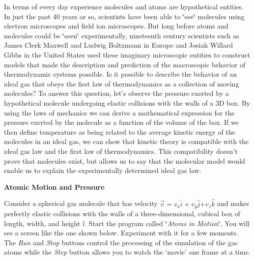 In terms of every day experience molecules and atoms are hypothetical
entities. In just the past 40 years or so, scientists have been able
to \char`\"{}see\char`\"{} molecules using electron microscopes and
field ion microscopes. But long before atoms and molecules could be
\char`\"{}seen\char`\"{} experimentally, nineteenth century scientists
such as James Clerk Maxwell and Ludwig Boltzmann in Europe and Josiah
Willard Gibbs in the United States used these imaginary microscopic
entities to construct models that made the description and prediction
of the macroscopic behavior of thermodynamic systems possible. Is
it possible to describe the behavior of an ideal gas that obeys the
first law of thermodynamics as a collection of moving molecules? To
answer this question, let's observe the pressure exerted by a hypothetical
molecule undergoing elastic collisions with the walls of a 3D box.
By using the laws of mechanics we can derive a mathematical expression
for the pressure exerted by the molecule as a function of the volume
of the box. If we then define temperature as being related to the
average kinetic energy of the molecules in an ideal gas, we can show
that kinetic theory is compatible with the ideal gas law and the first
law of thermodynamics. This compatibility doesn't prove that molecules
exist, but allows us to say that the molecular model would enable
us to explain the experimentally determined ideal gas law.

\textbf{Atomic Motion and Pressure}

Consider a spherical gas molecule that has velocity 
\( \overrightarrow{v}=v_{x} \)\( \hat{i}+v_{y} \)\( \hat{j} \)\( + v_z\hat k\) and
makes perfectly elastic collisions with the walls of a three-dimensional, cubical
box of length, width, and height $l$. Start the program called \char`\"{}\textit{Atoms
in Motion}\char`\"{}. You will see a screen
like the one shown below. Experiment with it for a few moments. 
The {\it Run} and {\it Stop} buttons control the processing of the 
simulation of the gas atoms while the {\it Step} button allows you to watch the
`movie' one frame at a time.

